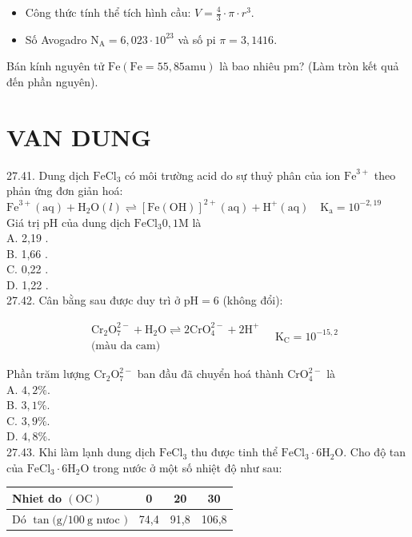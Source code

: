 \documentclass[10pt]{article}
\begin{document}
\begin{itemize}
  \item Công thức tính thể tích hình cầu: $V=\frac{4}{3} \cdot \pi \cdot r^{3}$.
  \item Số Avogadro $\mathrm{N}_{\mathrm{A}}=6,023 \cdot 10^{23}$ và số pi $\pi=3,1416$.
\end{itemize}

Bán kính nguyên tử $\mathrm{Fe}(\mathrm{Fe}=55,85 \mathrm{amu})$ là bao nhiêu pm? (Làm tròn kết quả đến phần nguyên).

\section*{VAN DUNG}
27.41. Dung dịch $\mathrm{FeCl}_{3}$ có môi trường acid do sự thuỷ phân của ion $\mathrm{Fe}^{3+}$ theo phản ứng đơn giản hoá:\\
$\mathrm{Fe}^{3+}(\mathrm{aq})+\mathrm{H}_{2} \mathrm{O}(l) \rightleftharpoons[\mathrm{Fe}(\mathrm{OH})]^{2+}(\mathrm{aq})+\mathrm{H}^{+}(\mathrm{aq}) \quad \mathrm{K}_{\mathrm{a}}=10^{-2,19}$\\
Giá trị pH của dung dịch $\mathrm{FeCl}_{3} 0,1 \mathrm{M}$ là\\
A. 2,19 .\\
B. 1,66 .\\
C. 0,22 .\\
D. 1,22 .\\
27.42. Cân bằng sau được duy trì ở $\mathrm{pH}=6$ (không đổi):

$$
\begin{aligned}
& \mathrm{Cr}_{2} \mathrm{O}_{7}^{2-}+\mathrm{H}_{2} \mathrm{O} \rightleftharpoons 2 \mathrm{CrO}_{4}^{2-}+2 \mathrm{H}^{+} \\
& \text {(màu da cam) }
\end{aligned} \quad \mathrm{K}_{\mathrm{C}}=10^{-15,2}
$$

Phần trăm lượng $\mathrm{Cr}_{2} \mathrm{O}_{7}^{2-}$ ban đầu đã chuyển hoá thành $\mathrm{CrO}_{4}^{2-}$ là\\
A. $4,2 \%$.\\
B. $3,1 \%$.\\
C. $3,9 \%$.\\
D. $4,8 \%$.\\
27.43. Khi làm lạnh dung dịch $\mathrm{FeCl}_{3}$ thu được tinh thể $\mathrm{FeCl}_{3} \cdot 6 \mathrm{H}_{2} \mathrm{O}$. Cho độ tan của $\mathrm{FeCl}_{3} \cdot 6 \mathrm{H}_{2} \mathrm{O}$ trong nước ở một số nhiệt độ như sau:

\begin{center}
\begin{tabular}{|l|c|c|c|}
\hline
Nhiet do $(\mathrm{OC})$ & 0 & 20 & 30 \\
\hline
Dó $\tan (\mathrm{g} / 100 \mathrm{~g}$ nưoc $)$ & 74,4 & 91,8 & 106,8 \\
\hline
\end{tabular}
\end{center}
\end{document}
